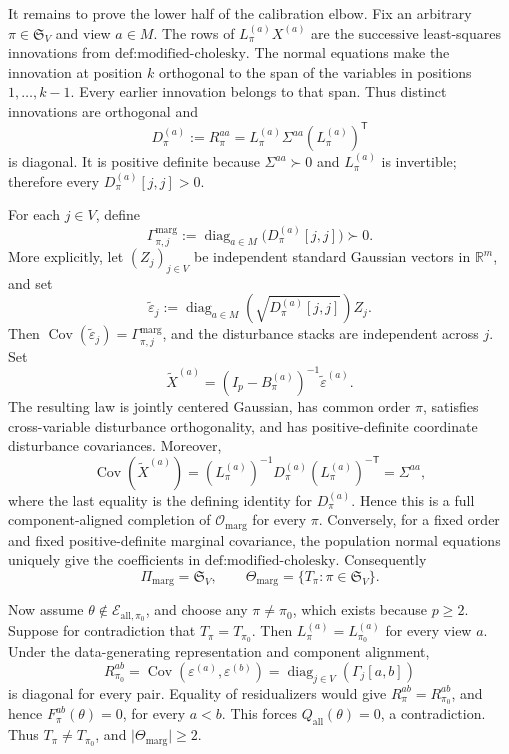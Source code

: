 It remains to prove the lower half of the calibration elbow.  Fix an arbitrary \(\pi\in\mathfrak S_V\) and view \(a\in M\).  The rows of \(L_\pi^{(a)}X^{(a)}\) are the successive least-squares innovations from \(\text{def:modified-cholesky}\).  The normal equations make the innovation at position \(k\) orthogonal to the span of the variables in positions \(1,\ldots,k-1\).  Every earlier innovation belongs to that span.  Thus distinct innovations are orthogonal and
\[
D_\pi^{(a)}:=R_\pi^{aa}=L_\pi^{(a)}\Sigma^{aa}(L_\pi^{(a)})^{\mathsf T}
\]
is diagonal.  It is positive definite because \(\Sigma^{aa}\succ0\) and \(L_\pi^{(a)}\) is invertible; therefore every \(D_\pi^{(a)}[j,j]>0\).

For each \(j\in V\), define
\[
\Gamma_{\pi,j}^{\mathrm{marg}}
:=\operatorname{diag}_{a\in M}\bigl(D_\pi^{(a)}[j,j]\bigr)\succ0.
\]
More explicitly, let \((Z_j)_{j\in V}\) be independent standard Gaussian vectors in \(\mathbb R^m\), and set
\[
\widetilde\varepsilon_j
:=\operatorname{diag}_{a\in M}\!\left(\sqrt{D_\pi^{(a)}[j,j]}\right)Z_j.
\]
Then \(\operatorname{Cov}(\widetilde\varepsilon_j)=\Gamma_{\pi,j}^{\mathrm{marg}}\), and the disturbance stacks are independent across \(j\).  Set
\[
\widetilde X^{(a)}=(I_p-B_\pi^{(a)})^{-1}\widetilde\varepsilon^{(a)}.
\]
The resulting law is jointly centered Gaussian, has common order \(\pi\), satisfies cross-variable disturbance orthogonality, and has positive-definite coordinate disturbance covariances.  Moreover,
\[
\operatorname{Cov}(\widetilde X^{(a)})
=(L_\pi^{(a)})^{-1}D_\pi^{(a)}(L_\pi^{(a)})^{-\mathsf T}
=\Sigma^{aa},
\]
where the last equality is the defining identity for \(D_\pi^{(a)}\).  Hence this is a full component-aligned completion of \(\mathcal O_{\mathrm{marg}}\) for every \(\pi\).  Conversely, for a fixed order and fixed positive-definite marginal covariance, the population normal equations uniquely give the coefficients in \(\text{def:modified-cholesky}\).  Consequently
\[
\Pi_{\mathrm{marg}}=\mathfrak S_V,
\qquad
\Theta_{\mathrm{marg}}=\{T_\pi:\pi\in\mathfrak S_V\}.
\]

Now assume \(\theta\notin\mathcal E_{\mathrm{all},\pi_0}\), and choose any \(\pi\ne\pi_0\), which exists because \(p\ge2\).  Suppose for contradiction that \(T_\pi=T_{\pi_0}\).  Then \(L_\pi^{(a)}=L_{\pi_0}^{(a)}\) for every view \(a\).  Under the data-generating representation and component alignment,
\[
R_{\pi_0}^{ab}
=\operatorname{Cov}(\varepsilon^{(a)},\varepsilon^{(b)})
=\operatorname{diag}_{j\in V}(\Gamma_j[a,b])
\]
is diagonal for every pair.  Equality of residualizers would give \(R_\pi^{ab}=R_{\pi_0}^{ab}\), and hence \(F_\pi^{ab}(\theta)=0\), for every \(a<b\).  This forces \(Q_{\mathrm{all}}(\theta)=0\), a contradiction.  Thus \(T_\pi\ne T_{\pi_0}\), and \(\lvert\Theta_{\mathrm{marg}}\rvert\ge2\).

